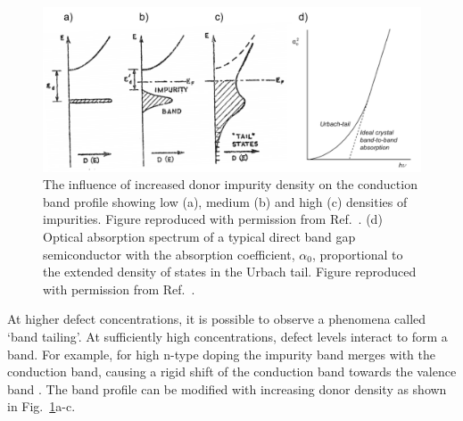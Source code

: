 \documentclass[11pt, twoside]{report}
\begin{document}
\begin{figure}[h!]
  \centering
    \includegraphics[width=1.0\textwidth]{figures/bt+u.png}
    \caption[The influence of increased donor impurity density on the conduction band profile showing low (a), medium (b) and high (c) densities of impurities. (d) Optical absorption spectrum of a typical direct band gap semiconductor with the absorption coefficient, $\alpha_{0}$, proportional to the extended density of states in the Urbach tail.]{The influence of increased donor impurity density on the conduction band profile showing low (a), medium (b) and high (c) densities of impurities. Figure reproduced with permission from Ref.~. (d) Optical absorption spectrum of a typical direct band gap semiconductor with the absorption coefficient, $\alpha_{0}$, proportional to the extended density of states in the Urbach tail. Figure reproduced with permission from Ref.~.}
  \label{bs2}
\end{figure}

At higher defect concentrations, it is possible to observe a phenomena called `band tailing'. At sufficiently high concentrations, defect levels interact to form a band. For example, for high n-type doping the impurity band merges with the conduction band, causing a rigid shift of the conduction band towards the valence band \cite{Pankove}. The band profile can be modified with increasing donor density as shown in Fig.~\ref{bs2}a-c. 
\end{document}
